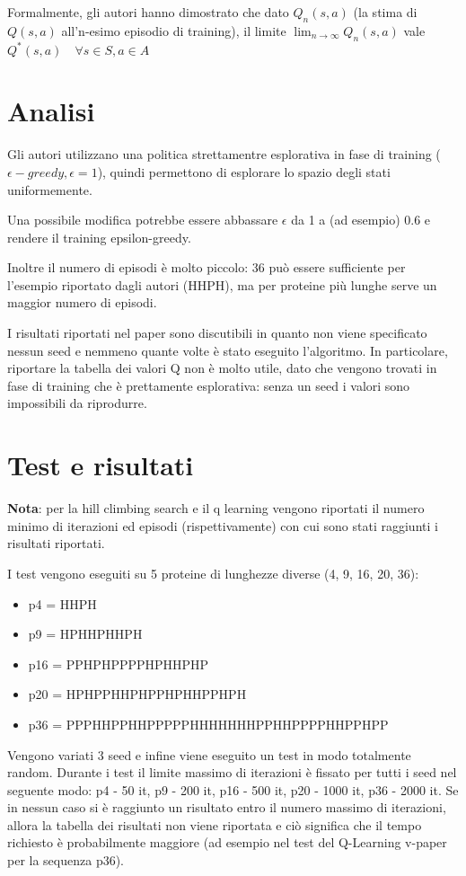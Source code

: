 \documentclass[conference]{IEEEtran}
\begin{document}
Formalmente, gli autori hanno dimostrato che dato $Q_n(s, a)$ (la stima di $Q(s,a)$ all'n-esimo episodio di training), il limite $\lim_{n \to \infty} Q_n (s,a)$ vale $Q^*(s,a) \quad \forall s \in S, a \in A$

\section{Analisi}

Gli autori utilizzano una politica strettamentre esplorativa in fase di training ($\epsilon-greedy, \epsilon = 1$), quindi permettono di esplorare lo spazio degli stati uniformemente.

Una possibile modifica potrebbe essere abbassare $\epsilon$ da 1 a (ad esempio) 0.6 e rendere il training epsilon-greedy.

Inoltre il numero di episodi è molto piccolo: 36 può essere sufficiente per l'esempio riportato dagli autori (HHPH), ma per proteine più lunghe serve un maggior numero di episodi.

I risultati riportati nel paper sono discutibili in quanto non viene specificato nessun seed e nemmeno quante volte è stato eseguito l'algoritmo. In particolare, riportare la tabella dei valori Q non è molto utile, dato che vengono trovati in fase di training che è prettamente esplorativa: senza un seed i valori sono impossibili da riprodurre.

\section{Test e risultati}

\textbf{Nota}: per la hill climbing search  e il q learning vengono riportati il numero minimo di iterazioni ed episodi (rispettivamente) con cui sono stati raggiunti i risultati riportati.

I test vengono eseguiti su 5 proteine di lunghezze diverse (4, 9, 16, 20, 36):

\begin{itemize}
 \item p4 = HHPH
 \item p9 = HPHHPHHPH
 \item p16 = PPHPHPPPPHPHHPHP
 \item p20 = HPHPPHHPHPPHPHHPPHPH
 \item p36 = PPPHHPPHHPPPPPHHHHHHHPPHHPPPPHHPPHPP
\end{itemize}

Vengono variati 3 seed e infine viene eseguito un test in modo totalmente random. Durante i test il limite massimo di iterazioni è fissato per tutti i seed nel seguente modo: p4 - 50 it, p9 - 200 it, p16 - 500 it, p20 - 1000 it, p36 - 2000 it. Se in nessun caso si è raggiunto un risultato entro il numero massimo di iterazioni, allora la tabella dei risultati non viene riportata e ciò significa che il tempo richiesto è probabilmente maggiore (ad esempio nel test del Q-Learning v-paper per la sequenza p36).
\end{document}

